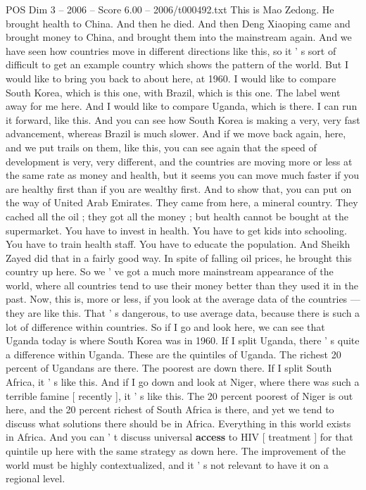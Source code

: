\begin{textsample}{POS Dim 3 – 2006 – Score 6.00 – 2006/t000492.txt}
This is Mao Zedong.
He brought health to China.
And then he died.
And then Deng Xiaoping came and brought money to China, and brought them into the mainstream again.
And we have seen how countries move in different directions like this, so it ' s sort of difficult to get an example country which shows the pattern of the world.
But I would like to bring you back to about here, at 1960.
I would like to compare South Korea, which is this one, with Brazil, which is this one.
The label went away for me here.
And I would like to compare Uganda, which is there.
I can run it forward, like this.
And you can see how South Korea is making a very, very fast advancement, whereas Brazil is much slower.
And if we move back again, here, and we put trails on them, like this, you can see again that the speed of development is very, very different, and the countries are moving more or less at the same rate as money and health, but it seems you can move much faster if you are healthy first than if you are wealthy first.
And to show that, you can put on the way of United Arab Emirates.
They came from here, a mineral country.
They cached all the oil ; they got all the money ; but health cannot be bought at the supermarket.
You have to invest in health.
You have to get kids into schooling.
You have to train health staff.
You have to educate the population.
And Sheikh Zayed did that in a fairly good way.
In spite of falling oil prices, he brought this country up here.
So we ' ve got a much more mainstream appearance of the world, where all countries tend to use their money better than they used it in the past.
Now, this is, more or less, if you look at the average data of the countries — they are like this.
That ' s dangerous, to use average data, because there is such a lot of difference within countries.
So if I go and look here, we can see that Uganda today is where South Korea was in 1960.
If I split Uganda, there ' s quite a difference within Uganda.
These are the quintiles of Uganda.
The richest 20 percent of Ugandans are there.
The poorest are down there.
If I split South Africa, it ' s like this.
And if I go down and look at Niger, where there was such a terrible famine [ recently ], it ' s like this.
The 20 percent poorest of Niger is out here, and the 20 percent richest of South Africa is there, and yet we tend to discuss what solutions there should be in Africa.
Everything in this world exists in Africa.
And you can ' t discuss universal \textbf{access} to HIV [ treatment ] for that quintile up here with the same strategy as down here.
The improvement of the world must be highly contextualized, and it ' s not relevant to have it on a regional level.

\end{textsample}
